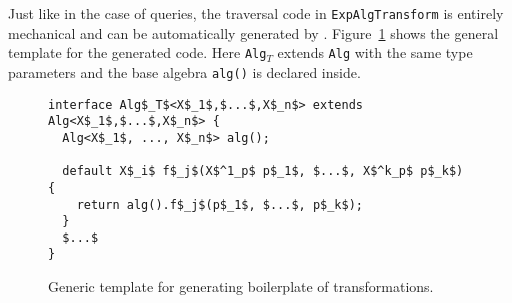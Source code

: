



\begin{comment}
\haoyuan{Begin: client code.}

Here we also give the client code. With the same expression \lstinline{x + (y + 2)}, a \lstinline{SubstVar} object is created. The base algebra \lstinline{expAlg()} here is implemented with an instance of \lstinline{FreeVars}, and we also override \lstinline{x()} and \lstinline{e()} aiming to substitute another variable \lstinline{"z"} for \lstinline{"x"}. The code is as follows, where the result of execution becomes \lstinline{[y, z]}.


\haoyuan{End: client code.}
\end{comment}


Just like in the case of queries, the traversal code in \lstinline{ExpAlgTransform}
is entirely mechanical and can be automatically generated by \Name.
Figure~\ref{trafoTemplate} shows
the general template for the generated code. Here
\lstinline{Alg}$_T$ extends \lstinline{Alg} with the same type parameters and
the base algebra \lstinline{alg()} is declared inside.

\begin{figure}[t]
\nocaptionrule
\begin{lstlisting}[mathescape=true]
interface Alg$_T$<X$_1$,$...$,X$_n$> extends Alg<X$_1$,$...$,X$_n$> {
  Alg<X$_1$, ..., X$_n$> alg();

  default X$_i$ f$_j$(X$^1_p$ p$_1$, $...$, X$^k_p$ p$_k$) {
    return alg().f$_j$(p$_1$, $...$, p$_k$);
  }
  $...$
}
\end{lstlisting}
\caption{Generic template for generating boilerplate of transformations.}
\label{trafoTemplate}
\end{figure}


